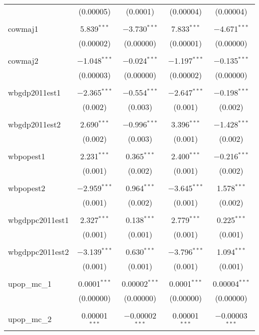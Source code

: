 \begin{table}[!htbp]
\begin{tabular}{@{\extracolsep{5pt}}lcccc}
  & (0.00005) & (0.0001) & (0.00004) & (0.00004) \\ 
  & & & & \\ 
 cowmaj1 & 5.839$^{***}$ & $-$3.730$^{***}$ & 7.833$^{***}$ & $-$4.671$^{***}$ \\ 
  & (0.00002) & (0.00000) & (0.00001) & (0.00000) \\ 
  & & & & \\ 
 cowmaj2 & $-$1.048$^{***}$ & $-$0.024$^{***}$ & $-$1.197$^{***}$ & $-$0.135$^{***}$ \\ 
  & (0.00003) & (0.00000) & (0.00002) & (0.00000) \\ 
  & & & & \\ 
 wbgdp2011est1 & $-$2.365$^{***}$ & $-$0.554$^{***}$ & $-$2.647$^{***}$ & $-$0.198$^{***}$ \\ 
  & (0.002) & (0.003) & (0.001) & (0.002) \\ 
  & & & & \\ 
 wbgdp2011est2 & 2.690$^{***}$ & $-$0.996$^{***}$ & 3.396$^{***}$ & $-$1.428$^{***}$ \\ 
  & (0.002) & (0.003) & (0.001) & (0.002) \\ 
  & & & & \\ 
 wbpopest1 & 2.231$^{***}$ & 0.365$^{***}$ & 2.400$^{***}$ & $-$0.216$^{***}$ \\ 
  & (0.001) & (0.002) & (0.001) & (0.002) \\ 
  & & & & \\ 
 wbpopest2 & $-$2.959$^{***}$ & 0.964$^{***}$ & $-$3.645$^{***}$ & 1.578$^{***}$ \\ 
  & (0.001) & (0.002) & (0.001) & (0.002) \\ 
  & & & & \\ 
 wbgdppc2011est1 & 2.327$^{***}$ & 0.138$^{***}$ & 2.779$^{***}$ & 0.225$^{***}$ \\ 
  & (0.001) & (0.001) & (0.001) & (0.001) \\ 
  & & & & \\ 
 wbgdppc2011est2 & $-$3.139$^{***}$ & 0.630$^{***}$ & $-$3.796$^{***}$ & 1.094$^{***}$ \\ 
  & (0.001) & (0.001) & (0.001) & (0.001) \\ 
  & & & & \\ 
 upop\_mc\_1 & 0.0001$^{***}$ & 0.00002$^{***}$ & 0.0001$^{***}$ & 0.00004$^{***}$ \\ 
  & (0.00000) & (0.00000) & (0.00000) & (0.00000) \\ 
  & & & & \\ 
 upop\_mc\_2 & 0.00001$^{***}$ & $-$0.00002$^{***}$ & 0.00001$^{***}$ & $-$0.00003$^{***}$ \\ 

\end{tabular}
\end{table}
